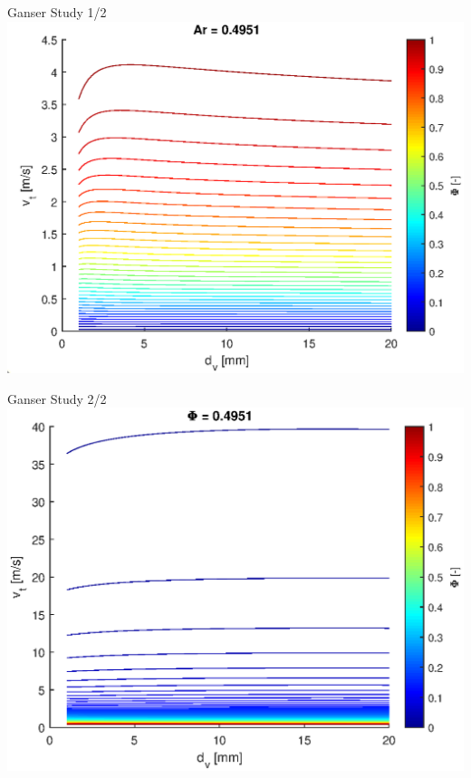 \documentclass[11pt]{beamer}
\begin{document}
	\begin{frame}{Ganser Study 1/2}
		\centering
		\includegraphics[width=\linewidth]{GanserStudy.eps}
	\end{frame}

	\begin{frame}{Ganser Study 2/2}
		\centering
		\includegraphics[width=\linewidth]{GanserStudy2.eps}
	\end{frame}
\end{document}
